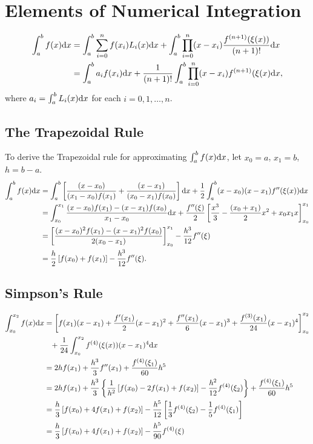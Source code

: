 \section{Elements of Numerical Integration}
\begin{align*}
    \int_a^bf(x)\mathrm{d} x &= \int_a^b\sum_{i=0}^nf(x_i)L_i(x)\mathrm{d} x + \int_a^b\prod_{i=0}^n(x-x_i)\frac{f^{(n+1)}(\xi(x))}{(n+1)!}\mathrm{d} x \\
    &= \int_a^ba_if(x_i)\mathrm{d} x + \frac{1}{(n+1)!}\int_a^b\prod_{i=0}^n(x-x_i)f^{(n+1)}(\xi(x)\mathrm{d} x,
\end{align*}
where $a_i=\int_a^bL_i(x)\mathrm{d} x$ for each $i=0,1,\ldots,n$.

\subsection{The Trapezoidal Rule}
To derive the Trapezoidal rule for approximating $\int_a^bf(x)\mathrm{d} x$, let $x_0=a$, $x_1=b$, $h=b-a$.
\begin{align*}
    \int_a^bf(x)\mathrm{d} x &= \int_a^b\left[\frac{(x-x_0)}{(x_1-x_0)f(x_1)}+\frac{(x-x_1)}{(x_0-x_1)f(x_0)}\right]\mathrm{d} x + \frac{1}{2}\int_a^b(x-x_0)(x-x_1)f''(\xi(x))\mathrm{d} x \\
    &= \int_{x_0}^{x_1}\frac{(x-x_0)f(x_1)-(x-x_1)f(x_0)}{x_1-x_0}\mathrm{d} x + \frac{f''(\xi)}{2}\left[\frac{x^3}{3}-\frac{(x_0+x_1)}{2}x^2+x_0x_1x\right]_{x_0}^{x_1} \\
    &= \left[\frac{(x-x_0)^2f(x_1)-(x-x_1)^2f(x_0)}{2(x_0-x_1)}\right]_{x_0}^{x_1} - \frac{h^3}{12}f''(\xi) \\
    &= \frac{h}{2}\left[f(x_0)+f(x_1)\right]-\frac{h^3}{12}f''(\xi).
\end{align*}

\subsection{Simpson's Rule}
\begin{align*}
    \int_{x_0}^{x_2}f(x)\mathrm{d} x &= \left[f(x_1)(x-x_1)+\frac{f'(x_1)}{2}(x-x_1)^2+\frac{f''(x_1)}{6}(x-x_1)^3+\frac{f^{(3)}(x_1)}{24}(x-x_1)^4\right]_{x_0}^{x_2} \\
    &\phantom{=} + \frac{1}{24}\int_{x_0}^{x_2}f^{(4)}(\xi(x))(x-x_1)^4\mathrm{d} x \\
    &= 2hf(x_1) + \frac{h^3}{3}f''(x_1) + \frac{f^{(4)}(\xi_1)}{60}h^5 \\
    &= 2hf(x_1)+\frac{h^3}{3}\left\{\frac{1}{h^2}\left[f(x_0)-2f(x_1)+f(x_2)\right]-\frac{h^2}{12}f^{(4)}(\xi_2)\right\} + \frac{f^{(4)}(\xi_1)}{60}h^5 \\
    &= \frac{h}{3}\left[f(x_0)+4f(x_1)+f(x_2)\right]-\frac{h^5}{12}\left[\frac{1}{3}f^{(4)}(\xi_2)-\frac{1}{5}f^{(4)}(\xi_1)\right] \\
    &= \frac{h}{3}\left[f(x_0)+4f(x_1)+f(x_2)\right]-\frac{h^5}{90}f^{(4)}(\xi)
\end{align*}

